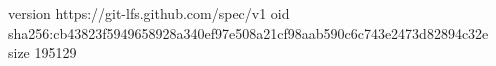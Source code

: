 version https://git-lfs.github.com/spec/v1
oid sha256:cb43823f5949658928a340ef97e508a21cf98aab590c6c743e2473d82894c32e
size 195129
